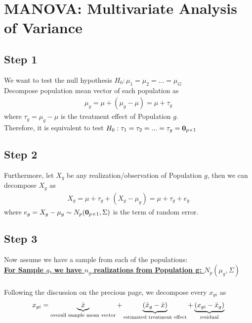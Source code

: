 \documentclass[12pt]{extarticle}
\newcommand{\<}{\langle}
\renewcommand{\>}{\rangle}
\theoremstyle{definition}
\begin{document}
\section{MANOVA: Multivariate Analysis of Variance}
\subsection{Step 1}
We want to test the null hypothesis $H_0: \mu_1 = \mu_2 = ...  = \mu_G$ \\
Decompose population mean vector of each population as \\
\begin{eqnarray*}
\mu_g = \mu + (\mu_g -\mu) = \mu + \tau_g
\end{eqnarray*}
where $\tau_g = \mu_g - \mu$ is the treatment effect of Population $g$. \\
Therefore, it is equivalent to test $H_0: \tau_1 = \tau_2 =...= \tau_g = {\bf 0}_{p \times 1}$ \\


\subsection{Step 2}
Furthermore, let $X_g$ be any realization/observation of Population $g$, then we can decompose $X_g$ as \\
\begin{eqnarray*}
X_g = \mu + \tau_g + (X_g - \mu_g) = \mu + \tau_g + e_g
\end{eqnarray*}
where $e_g = X_g - \mu_g \sim N_p({\bf 0}_{p \times 1}, \Sigma)$ is the term of random error.


\subsection{Step 3}
Now assume we have a sample from each of the populations: \\
\underline{\bf For Sample $g$, we have $n_g$ realizations from Population g: $N_p (\mu_g, \Sigma)$} \\
\ \\ 
Following the discussion on the precious page, we decompose every $x_{gi}$ as \\
\begin{eqnarray*}
x_{gi} = \underbrace{\Bar{x}}_\text{overall sample mean vector} + \underbrace{(\Bar{x}_g - \Bar{x})}_\text{estimated treatment effect} + \underbrace{(x_{gi} - \Bar{x}_g)}_\text{residual}
\end{eqnarray*}
\end{document}
